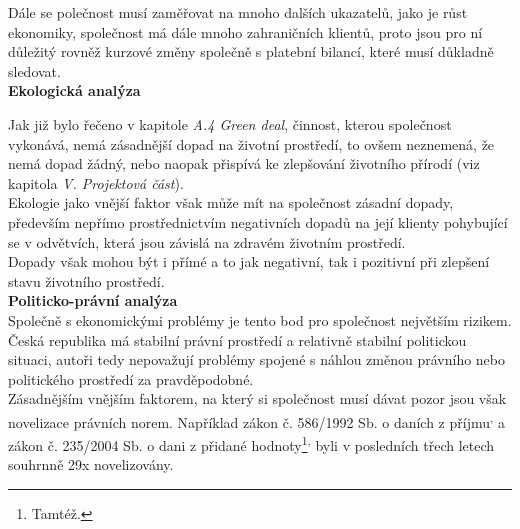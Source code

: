 Dále se polečnost musí zaměřovat na mnoho dalších ukazatelů, jako je růst ekonomiky, společnost má dále mnoho zahraničních klientů, proto jsou pro ní důležitý rovněž kurzové změny společně s platební bilancí, které musí důkladně sledovat.\\




\noindent\textbf{Ekologická analýza}\\

\vspace*{-2mm}

Jak již bylo řečeno v kapitole \textit{A.4 Green deal}, činnost, kterou společnost vykonává, nemá zásadnější dopad na životní prostředí, to ovšem neznemená, že nemá dopad žádný, nebo naopak přispívá ke zlepšování životního přírodí (viz kapitola \textit{V. Projektová část}).\\

Ekologie jako vnější faktor však může mít na společnost zásadní dopady, především nepřímo prostřednictvím negativních dopadů na její klienty pohybující se v odvětvích, která jsou závislá na zdravém životním prostředí.\\

Dopady však mohou být i přímé a to jak negativní, tak i pozitivní při zlepšení stavu životního prostředí.\\

\noindent\textbf{Politicko-právní analýza}\\

Společně s ekonomickými problémy je tento bod pro společnost největším rizikem. Česká republika má stabilní právní prostředí a relativně stabilní politickou situaci, autoři tedy nepovažují problémy spojené s náhlou změnou právního nebo politického prostředí za pravděpodobné.\\

Zásadnějším vnějším faktorem, na který si společnost musí dávat pozor jsou však novelizace právních norem. Například zákon č. 586/1992 Sb. o daních z příjmu\textsuperscript{,} a zákon č. 235/2004 Sb. o dani z přidané hodnoty\footnote{Tamtéž.}\textsuperscript{,} byli v posledních třech letech souhrnně 29x novelizovány.\\

